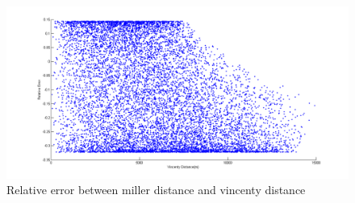 \documentclass[final,1p,times]{elsarticle}
\begin{document}
\begin{figure}[thpb]
      \centering
      \includegraphics[width=14cm]{Vincenty.png}
      \caption{Relative error between miller distance and vincenty distance}
      \label{fig:Vincenty}
\end{figure}
\end{document}
